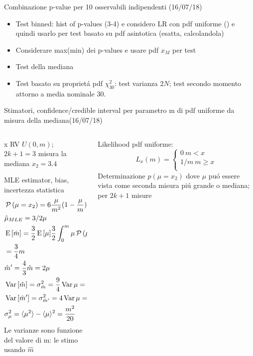 \begin{wordonframe}{Combinazione p-value per 10 osservabili indipendenti (16/07/18)}
\begin{itemize}
	\item Test binned: hist of p-values (3-4) e considero LR con pdf uniforme () e quindi usarlo per test basato su pdf asintotica (esatta, calcolandola)
	\item Considerare max(min) dei p-values e usare pdf $x_M$ per test
	\item Test della mediana
	\item Test basato su propriet\'a pdf $\chi^2_{30}$: test varianza $2N$; test secondo momento attorno a media nominale 30.
\end{itemize}
\end{wordonframe}

\begin{wordonframe}{Stimatori, confidence/credible interval per parametro m di pdf uniforme da misura della mediana(16/07/18)}
\begin{columns}[T]\begin{column}{0.5\textwidth}
x RV $U(0,m)$; $2k+1=3$ misura la mediana $x_2=3.4$
\begin{block}{MLE estimator, bias, incertezza statistica}
\begin{align*}
&\operatorname{\mathcal{P}}{(\mu=x_2)}=6\frac{\mu}{m^2}(1-\frac{\mu}{m})\\
&\hat{\mu}_{MLE}=3/2\mu\\
&\operatorname{E}{[\hat{m}]}=\frac{3}{2}\operatorname{E}{[\mu]}\frac{3}{2}\int_0^{m}\mu\operatorname{\mathcal{P}}{(\mu)}\,d\mu\\
&=\frac{3}{4}m\\
&\hat{m}'=\frac{4}{3}\hat{m}=2\mu\\
&\operatorname{Var}{[\hat{m}]}=\sigma^2_{\hat{m}}=\frac{9}{4}\operatorname{Var}{\mu}=\frac{9}{4}\sigma_{\mu}^2\\
&\operatorname{Var}{[\hat{m}']}=\sigma^2_{\hat{m}'}=4\operatorname{Var}{\mu}=4\sigma_{\mu}^2\\
&\sigma^2_{\mu}=\langle \mu^2 \rangle-\langle \mu \rangle^2=\frac{m^2}{20}
\end{align*}
Le varianze sono funzione del valore di m: le stimo usando $\hat{m}$
\end{block}
\end{column}\begin{column}{0.5\textwidth}
Likelihood pdf uniforme: \begin{equation*}L_x(m)=\left\{\begin{array}{c}
0\ m<x\\
1/m\ m\geq x\\
\end{array}\right.
\end{equation*}
Determinazione $p(\mu=x_2)$ dove $\mu$ pu\'o essere vista come seconda misura pi\'u grande o mediana; per $2k+1$ misure

\end{column}
\end{columns}
\end{wordonframe}
